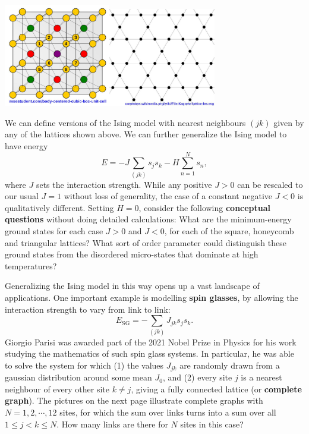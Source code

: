 \documentclass[12 pt]{article} %
\begin{document}
\begin{center}\includegraphics[width=0.35\textwidth]{figs/bcc.pdf}\hspace{0.25\textwidth}\includegraphics[width=0.35\textwidth]{figs/kagome.pdf}\end{center}

We can define versions of the Ising model with nearest neighbours $(jk)$ given by any of the lattices shown above.
We can further generalize the Ising model to have energy
\begin{equation*}
  E = -J \sum_{(jk)} s_j s_k - H \sum_{n = 1}^N s_n,
\end{equation*}
where $J$ sets the interaction strength.
While any positive $J > 0$ can be rescaled to our usual $J = 1$ without loss of generality, the case of a constant negative $J < 0$ is qualitatively different.
Setting $H = 0$, consider the following \textbf{conceptual questions} without doing detailed calculations:
What are the minimum-energy ground states for each case $J > 0$ and $J < 0$, for each of the square, honeycomb and triangular lattices?
What sort of order parameter could distinguish these ground states from the disordered micro-states that dominate at high temperatures?

Generalizing the Ising model in this way opens up a vast landscape of applications.
One important example is modelling \textbf{spin glasses}, by allowing the interaction strength to vary from link to link:
\begin{equation*}
  E_{\text{SG}} = -\sum_{(jk)} J_{jk} s_j s_k.
\end{equation*}
Giorgio Parisi was awarded part of the 2021 Nobel Prize in Physics for his work studying the mathematics of such spin glass systems.
In particular, he was able to solve the system for which (1) the values $J_{jk}$ are randomly drawn from a gaussian distribution around some mean $J_0$, and (2) every site $j$ is a nearest neighbour of every other site $k \ne j$, giving a fully connected lattice (or \textbf{complete graph}).
The pictures on the next page illustrate complete graphs with $N = 1, 2, \cdots, 12$ sites, for which the sum over links turns into a sum over all $1 \leq j < k \leq N$.
How many links are there for $N$ sites in this case?
\end{document}
